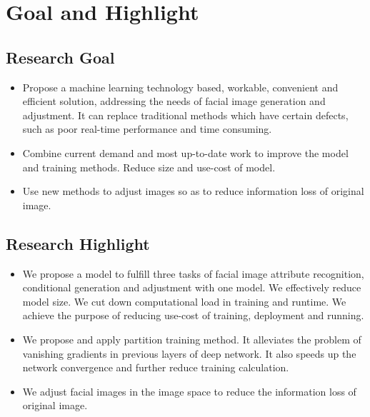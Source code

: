 \section{Goal and Highlight}

\subsection{Research Goal}
\begin{itemize}
\item
Propose a machine learning technology based, workable, convenient and efficient solution,
    addressing the needs of facial image generation and adjustment.
It can replace traditional methods which have certain defects, such as poor real-time performance and time consuming.
\item
Combine current demand and most up-to-date work to improve the model and training methods.
Reduce size and use-cost of model.
\item
Use new methods to adjust images so as to reduce information loss of original image.
\end{itemize}
\subsection{Research Highlight}
\begin{itemize}
\item
We propose a model to fulfill three tasks of facial image attribute recognition,
    conditional generation and adjustment with one model.
We effectively reduce model size.
We cut down computational load in training and runtime.
We achieve the purpose of reducing use-cost of training, deployment and running.
\item
We propose and apply partition training method.
It alleviates the problem of vanishing gradients in previous layers of deep network.
It also speeds up the network convergence and further reduce training calculation.

\item
We adjust facial images in the image space to reduce the information loss of original image.
\end{itemize}
